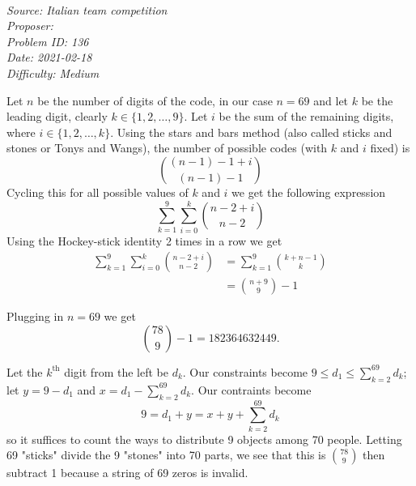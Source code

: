\SSbreak\\
\emph{Source: Italian team competition}\\
\emph{Proposer: \Phobo}\\ %
\emph{Problem ID: 136}\\
\emph{Date: 2021-02-18}\\
\emph{Difficulty: Medium}\\
\SSbreak

\bigskip

\begin{solution}\hfil\medskip

Let $n$ be the number of digits of the code, in our case $n=69$ and let $k$ be the leading digit, clearly $k\in\{1,2,\dots,9\}$. Let $i$ be the sum of the remaining digits, where $i\in\{1,2,\dots,k\}$. Using the stars and bars method (also called sticks and stones or Tonys and Wangs), the number of possible codes (with $k$ and $i$ fixed) is $$\binom{(n-1)-1+i}{(n-1)-1}$$ Cycling this for all possible values of $k$ and $i$ we get the following expression $$\sum_{k=1}^{9}\sum_{i=0}^{k}\binom{n-2+i}{n-2}$$ Using the Hockey-stick identity 2 times in a row we get 
\begin{align*}
    \sum_{k=1}^{9}\sum_{i=0}^{k}\binom{n-2+i}{n-2}&=\sum_{k=1}^{9}\binom{k+n-1}{k} \\
    &=\binom{n+9}{9}-1
\end{align*}

Plugging in $n = 69$ we get $$\binom{78}{9} - 1 = \boxed{182364632449}.$$
	
\end{solution}\bigskip

\begin{solution}\hfil\medskip

	Let the $k^\text{th}$ digit from the left be $d_k$. Our constraints become $9 \leq d_1 \leq \sum_{k = 2}^{69} d_k$; let $y = 9 - d_1$ and $x = d_1 - \sum_{k = 2}^{69}d_k$.
	Our contraints become $$9 = d_1 + y = x + y + \sum_{k = 2}^{69} d_k$$ so it suffices to count the ways to distribute 9 objects among 70 people.
	Letting 69 "sticks" divide the 9 "stones" into 70 parts, we see that this is $\binom{78}{9}$ then subtract 1 because a string of 69 zeros is invalid. 
\end{solution}
